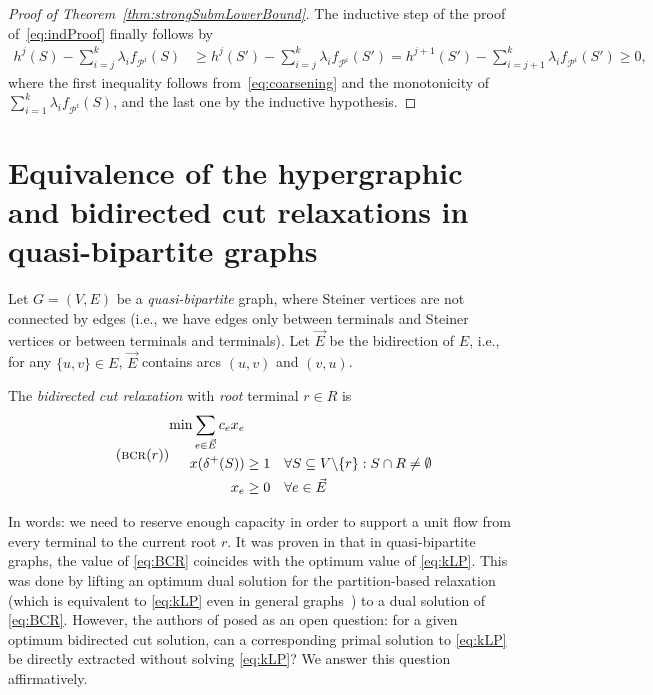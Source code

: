 \documentclass[11pt, letterpaper]{article}
\theoremstyle{definition}
\begin{document}
\begin{proof}[Proof of Theorem~\ref{thm:strongSubmLowerBound}]
The inductive step of the proof of~\eqref{eq:indProof}
finally follows by
\begin{align*}
h^j(S)-\sum_{i=j}^k \lambda_i f_{\mathcal{P}^i}(S)
 &\geq h^{j}(S') - \sum_{i=j}^k \lambda_i f_{\mathcal{P}^i}(S')
 = h^{j+1}(S') - \sum_{i=j+1}^k \lambda_i f_{\mathcal{P}^i}(S')
 \geq 0,
\end{align*}
where the first inequality follows from~\eqref{eq:coarsening}
and the monotonicity of $\sum_{i=1}^k \lambda_i f_{\mathcal{P}^i}(S)$,
and the last one by the inductive hypothesis.
\end{proof}









\section{Equivalence of the hypergraphic and bidirected cut relaxations in quasi-bipartite
  graphs\label{sec:equivalence}}

Let $G=(V,E)$ be a \emph{quasi-bipartite} graph, where
Steiner vertices are not connected by edges (i.e., we have edges only between 
terminals and Steiner vertices or between terminals and terminals). 
 Let $\vec{E}$ be the bidirection of $E$, 
 i.e., for any $\{u,v\} \in E$, $\vec{E}$ contains arcs $(u,v)$ and $(v,u)$.

The \emph{bidirected cut relaxation} with \emph{root} terminal $r \in R$ is  
\begin{equation}\tag{{\textsc{bcr}($r$)}}\label{eq:BCR}
\begin{aligned}
 \min \sum_{e \in \vec{E}} c_e x_e &    \\  
  x(\delta^+(S)) &\displaystyle\geq 1 \quad \forall S \subseteq V \backslash \{ r\}: S \cap R \neq \emptyset \\
  x_e &\geq 0 \quad \forall e \in \vec{E}  
\end{aligned}
\end{equation}



In words: we need to reserve enough capacity in order to support a  unit flow from every terminal to the current root $r$.
It was proven in \cite{chakrabarty_2010_hypergraphic} that in 
quasi-bipartite graphs, the value of \eqref{eq:BCR} coincides with
the optimum value of \eqref{eq:kLP}. This was done by lifting an
optimum dual solution for the partition-based relaxation (which is equivalent 
to \eqref{eq:kLP} even in general graphs~\cite{chakrabarty_2010_hypergraphic}) to a dual solution of 
\eqref{eq:BCR}. However, the authors of \cite{chakrabarty_2010_hypergraphic} posed as an open question: for a given optimum bidirected cut solution, can a
corresponding primal solution to \eqref{eq:kLP} be directly
extracted without solving \eqref{eq:kLP}? We answer this 
question affirmatively.
 
\end{document}
